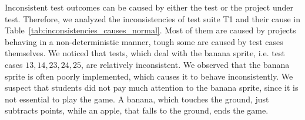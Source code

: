 Inconsistent test outcomes can be caused by either the test or the project under test.
Therefore, we analyzed the inconsistencies of test suite T1 and their cause in Table~\ref{tab:inconsistencies_causes_normal}.
Most of them are caused by projects behaving in a non-deterministic manner,
tough some are caused by test cases themselves.
We noticed that tests, which deal with the banana sprite, i.e. test cases $13, 14, 23, 24, 25$, are relatively inconsistent.
We observed that the banana sprite is often poorly implemented, which causes it to behave inconsistently.
We suspect that students did not pay much attention to the banana sprite, since it is not essential to play the game.
A banana, which touches the ground, just subtracts points, while an apple, that falls to the ground, ends the game.
\parspace


